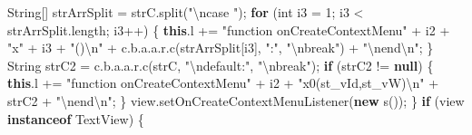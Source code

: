 \documentclass[
]{article}
\newenvironment{Shaded}{}{}
\newcommand{\BuiltInTok}[1]{\textcolor[rgb]{0.00,0.50,0.00}{#1}}
\newcommand{\ControlFlowTok}[1]{\textcolor[rgb]{0.00,0.44,0.13}{\textbf{#1}}}
\newcommand{\DataTypeTok}[1]{\textcolor[rgb]{0.56,0.13,0.00}{#1}}
\newcommand{\DecValTok}[1]{\textcolor[rgb]{0.25,0.63,0.44}{#1}}
\newcommand{\FunctionTok}[1]{\textcolor[rgb]{0.02,0.16,0.49}{#1}}
\newcommand{\KeywordTok}[1]{\textcolor[rgb]{0.00,0.44,0.13}{\textbf{#1}}}
\newcommand{\NormalTok}[1]{#1}
\newcommand{\OperatorTok}[1]{\textcolor[rgb]{0.40,0.40,0.40}{#1}}
\newcommand{\SpecialCharTok}[1]{\textcolor[rgb]{0.25,0.44,0.63}{#1}}
\newcommand{\StringTok}[1]{\textcolor[rgb]{0.25,0.44,0.63}{#1}}
\begin{document}
\begin{Shaded}
\begin{Highlighting}[]
            \BuiltInTok{String}\OperatorTok{[]}\NormalTok{ strArrSplit }\OperatorTok{=}\NormalTok{ strC}\OperatorTok{.}\FunctionTok{split}\OperatorTok{(}\StringTok{"}\SpecialCharTok{\textbackslash{}n}\StringTok{case "}\OperatorTok{);}
            \ControlFlowTok{for} \OperatorTok{(}\DataTypeTok{int}\NormalTok{ i3 }\OperatorTok{=} \DecValTok{1}\OperatorTok{;}\NormalTok{ i3 }\OperatorTok{\textless{}}\NormalTok{ strArrSplit}\OperatorTok{.}\FunctionTok{length}\OperatorTok{;}\NormalTok{ i3}\OperatorTok{++)} \OperatorTok{\{}
                \KeywordTok{this}\OperatorTok{.}\FunctionTok{l} \OperatorTok{+=} \StringTok{"function onCreateContextMenu"} \OperatorTok{+}\NormalTok{ i2 }\OperatorTok{+} \StringTok{"x"} \OperatorTok{+}\NormalTok{ i3 }\OperatorTok{+} \StringTok{"()}\SpecialCharTok{\textbackslash{}n}\StringTok{"} \OperatorTok{+}\NormalTok{ c}\OperatorTok{.}\FunctionTok{b}\OperatorTok{.}\FunctionTok{a}\OperatorTok{.}\FunctionTok{a}\OperatorTok{.}\FunctionTok{r}\OperatorTok{.}\FunctionTok{c}\OperatorTok{(}\NormalTok{strArrSplit}\OperatorTok{[}\NormalTok{i3}\OperatorTok{],} \StringTok{":"}\OperatorTok{,} \StringTok{"}\SpecialCharTok{\textbackslash{}n}\StringTok{break"}\OperatorTok{)} \OperatorTok{+} \StringTok{"}\SpecialCharTok{\textbackslash{}n}\StringTok{end}\SpecialCharTok{\textbackslash{}n}\StringTok{"}\OperatorTok{;}
            \OperatorTok{\}}
            \BuiltInTok{String}\NormalTok{ strC2 }\OperatorTok{=}\NormalTok{ c}\OperatorTok{.}\FunctionTok{b}\OperatorTok{.}\FunctionTok{a}\OperatorTok{.}\FunctionTok{a}\OperatorTok{.}\FunctionTok{r}\OperatorTok{.}\FunctionTok{c}\OperatorTok{(}\NormalTok{strC}\OperatorTok{,} \StringTok{"}\SpecialCharTok{\textbackslash{}n}\StringTok{default:"}\OperatorTok{,} \StringTok{"}\SpecialCharTok{\textbackslash{}n}\StringTok{break"}\OperatorTok{);}
            \ControlFlowTok{if} \OperatorTok{(}\NormalTok{strC2 }\OperatorTok{!=} \KeywordTok{null}\OperatorTok{)} \OperatorTok{\{}
                \KeywordTok{this}\OperatorTok{.}\FunctionTok{l} \OperatorTok{+=} \StringTok{"function onCreateContextMenu"} \OperatorTok{+}\NormalTok{ i2 }\OperatorTok{+} \StringTok{"x0(st\_vId,st\_vW)}\SpecialCharTok{\textbackslash{}n}\StringTok{"} \OperatorTok{+}\NormalTok{ strC2 }\OperatorTok{+} \StringTok{"}\SpecialCharTok{\textbackslash{}n}\StringTok{end}\SpecialCharTok{\textbackslash{}n}\StringTok{"}\OperatorTok{;}
            \OperatorTok{\}}
\NormalTok{            view}\OperatorTok{.}\FunctionTok{setOnCreateContextMenuListener}\OperatorTok{(}\KeywordTok{new} \FunctionTok{s}\OperatorTok{());}
        \OperatorTok{\}}
        \ControlFlowTok{if} \OperatorTok{(}\NormalTok{view }\KeywordTok{instanceof}\NormalTok{ TextView}\OperatorTok{)} \OperatorTok{\{}

\end{Highlighting}
\end{Shaded}
\end{document}
